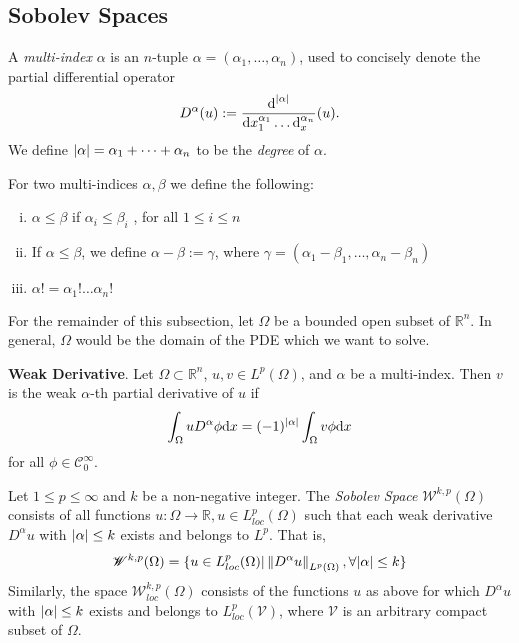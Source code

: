 \subsection{Sobolev Spaces}
\begin{defn}
	A \textit{multi-index} $\alpha$ is an $n$-tuple $\alpha = (\alpha_1, \dots, \alpha_n)$, used to concisely
denote the partial differential operator
	\begin{equation}
		D^\alpha (u) := \frac{\text{d}^{\vert\alpha\vert}}{\text{d}x_{1}^{\alpha_1}\dots\text{d}_{x}^{\alpha_n}} (u).
	\end{equation}
	We define $ \vert\alpha\vert = \alpha_1 + \dots + \alpha_n $ to be the \textit{degree} of $\alpha$.
\end{defn}
\begin{defn}
	For two multi-indices $\alpha, \beta$ we define the following:
	\begin{enumerate}[i.]
		\item $\alpha \leq \beta$ if $\alpha_i \leq \beta_i$ , for all $1 \leq i \leq n$
		\item If $\alpha \leq \beta$, we define $\alpha - \beta := \gamma$, where $\gamma = (\alpha_1-\beta_1, \dots,\alpha_n - \beta_n)$
		\item $\alpha! = \alpha_1!\dots\alpha_n!$
	\end{enumerate}
\end{defn}
\begin{notation}
	For the remainder of this subsection, let $\Omega$ be a bounded open subset of $\mathbb{R}^n$. In general, $\Omega$ would be the domain of the PDE which we want to solve.
\end{notation}
\begin{defn}
	\textbf{Weak Derivative}. Let $\Omega \subset \mathbb{R}^n$, $u, v \in L^p(\Omega)$, and $\alpha$ be a multi-index. Then $v$ is the weak $\alpha$-th partial derivative of $u$ if
	\begin{equation*}
	\int_{\Omega} uD^\alpha\phi \text{d}x = (-1)^{\vert\alpha\vert}\int_{\Omega}v\phi\text{d}x
	\end{equation*}
	for all $\phi \in \mathscr{C}_{0}^{\infty}$.
\end{defn}
\begin{defn}
	Let $1\leq p \leq \infty$ and $k$ be a non-negative integer. The \textit{Sobolev Space} $\mathscr{W}^{k,p}(\Omega)$ consists of all functions $u : \Omega \to \mathbb{R}, u \in L^{p}_{loc} (\Omega)$ such that each weak
derivative $D^{\alpha}u$ with $\vert\alpha\vert\leq k$ exists and belongs to $L^p$. That is,
	\begin{equation}
		\mathscr{W}^{k,p}(\Omega) = \{u \in L^{p}_{loc}(\Omega) \vert \left\lVert D^{\alpha}u\right\rVert_{L^p(\Omega)}, \forall \vert\alpha\vert\leq k\}
	\end{equation}
	Similarly, the space $\mathscr{W}^{k,p}_{loc}(\Omega)$
consists of the functions $u$ as above for which $D^\alpha u$ with $\vert\alpha\vert \leq k$ exists and belongs to $L^{p}_{loc}(\mathscr{V})$, where $\mathscr{V}$ is an arbitrary compact subset of $\Omega$.
\end{defn}
